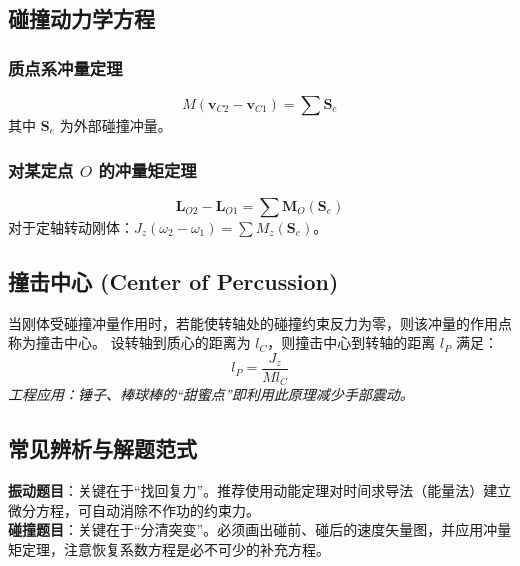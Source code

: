 \documentclass[12pt,a4paper]{article}
\newcommand{\vect}[1]{\mathbf{#1}}                   %
\begin{document}
\subsection{碰撞动力学方程}
\subsubsection{质点系冲量定理}
\begin{equation}
    M(\vect{v}_{C2} - \vect{v}_{C1}) = \sum \vect{S}_e
\end{equation}
其中 $\vect{S}_e$ 为外部碰撞冲量。

\subsubsection{对某定点 $O$ 的冲量矩定理}
\begin{equation}
    \vect{L}_{O2} - \vect{L}_{O1} = \sum \vect{M}_O(\vect{S}_e)
\end{equation}
对于定轴转动刚体：$J_z(\omega_2 - \omega_1) = \sum M_z(\vect{S}_e)$。

\subsection{ 撞击中心 (Center of Percussion)}
当刚体受碰撞冲量作用时，若能使转轴处的碰撞约束反力为零，则该冲量的作用点称为撞击中心。
设转轴到质心的距离为 $l_C$，则撞击中心到转轴的距离 $l_P$ 满足：
\begin{equation}
    l_P = \frac{J_z}{M l_C}
\end{equation}
\textit{工程应用：锤子、棒球棒的“甜蜜点”即利用此原理减少手部震动。}

\subsection{常见辨析与解题范式}

\begin{tcolorbox}[colback=blue!5, colframe=blue!75!black, title=解题策略：振动 vs 碰撞]
    \textbf{振动题目}：关键在于“找回复力”。推荐使用动能定理对时间求导法（能量法）建立微分方程，可自动消除不作功的约束力。\\
    \textbf{碰撞题目}：关键在于“分清突变”。必须画出碰前、碰后的速度矢量图，并应用冲量矩定理，注意恢复系数方程是必不可少的补充方程。
\end{tcolorbox}
\end{document}
